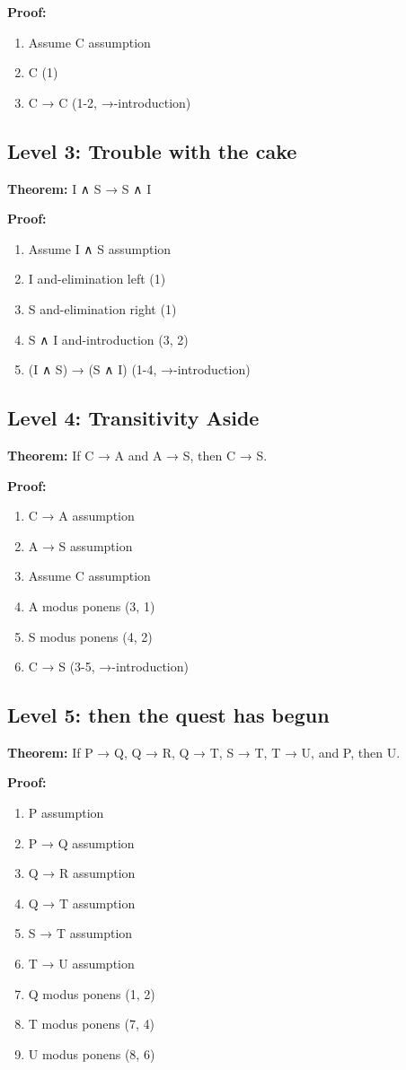 \documentclass{article}
\theoremstyle{theorem}
\theoremstyle{definition}
\theoremstyle{remark}
\begin{document}
\textbf{Proof:}
\begin{enumerate}
    \item Assume C \hfill assumption
    \item C \hfill (1)
    \item C → C \hfill (1-2, →-introduction)
\end{enumerate}

\subsection{Level 3: Trouble with the cake}
\textbf{Theorem:} I ∧ S → S ∧ I

\textbf{Proof:}
\begin{enumerate}
    \item Assume I ∧ S \hfill assumption
    \item I \hfill and-elimination left (1)
    \item S \hfill and-elimination right (1)
    \item S ∧ I \hfill and-introduction (3, 2)
    \item (I ∧ S) → (S ∧ I) \hfill (1-4, →-introduction)
\end{enumerate}

\subsection{Level 4: Transitivity Aside}
\textbf{Theorem:} If C → A and A → S, then C → S.

\textbf{Proof:}
\begin{enumerate}
    \item C → A \hfill assumption
    \item A → S \hfill assumption
    \item Assume C \hfill assumption
    \item A \hfill modus ponens (3, 1)
    \item S \hfill modus ponens (4, 2)
    \item C → S \hfill (3-5, →-introduction)
\end{enumerate}

\subsection{Level 5: then the quest has begun}
\textbf{Theorem:} If P → Q, Q → R, Q → T, S → T, T → U, and P, then U.

\textbf{Proof:}
\begin{enumerate}
    \item P \hfill assumption
    \item P → Q \hfill assumption
    \item Q → R \hfill assumption
    \item Q → T \hfill assumption
    \item S → T \hfill assumption
    \item T → U \hfill assumption
    \item Q \hfill modus ponens (1, 2)
    \item T \hfill modus ponens (7, 4)
    \item U \hfill modus ponens (8, 6)
\end{enumerate}
\end{document}
